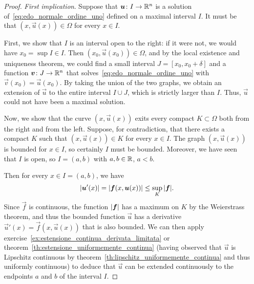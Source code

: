 \begin{proof}
\emph{First implication}.
Suppose that $\boldsymbol u\colon I \to {\mathbb R}^n$ is a solution
of~\eqref{eq:edo_normale_ordine_uno} defined on a maximal interval $I$. It must
be that $(x,\vec u(x))\in \Omega$ for every $x\in I$.

First, we show that $I$ is an interval open to the right: if it were not, we
would have $x_0=\sup I \in I$. Then $(x_0,\vec u(x_0))\in \Omega$, and by the
local existence and uniqueness theorem, we could find a small interval
$J=[x_0,x_0+\delta]$ and a function $\boldsymbol v\colon J\to {\mathbb R}^n$ that
solves~\eqref{eq:edo_normale_ordine_uno} with $\vec v(x_0)=\vec u(x_0)$. By
taking the union of the two graphs, we obtain an extension of $\vec u$ to the
entire interval $I\cup J$, which is strictly larger than $I$. Thus, $\vec u$
could not have been a maximal solution.

Now, we show that the curve $(x,\vec u(x))$ exits every compact $K\subset
\Omega$ both from the right and from the left. Suppose, for contradiction, that
there exists a compact $K$ such that $(x,\vec u(x))\in K$ for every $x\in I$.
The graph $(x,\vec u(x))$ is bounded for $x\in I$, so certainly $I$ must be
bounded. Moreover, we have seen that $I$ is open, so $I=(a,b)$ with $a,b\in
{\mathbb R}$, $a<b$.

Then for every $x\in I=(a,b)$, we have
\[
  {\left|\boldsymbol u'(x)\right|} = {\left|\boldsymbol f(x, \boldsymbol u(x))\right|}
   \le \sup_K {\left|\boldsymbol f\right|}.
\]
Since $\vec f$ is continuous, the function ${\left|\boldsymbol f\right|}$ has a maximum on $K$
by the Weierstrass theorem, and thus the bounded function $\vec u$ has a
derivative $\vec u'(x)=\vec f(x,\vec u(x))$ that is also bounded. We can then
apply exercise~\ref{ex:estensione_continua_derivata_limitata} or
theorem~\ref{th:estensione_uniformemente_continua} (having observed that $\vec
u$ is Lipschitz continuous by theorem~\ref{th:lipschitz_uniformemente_continua}
and thus uniformly continuous) to deduce that $\vec u$ can be extended
continuously to the endpoints $a$ and $b$ of the interval $I$.


\end{proof}
